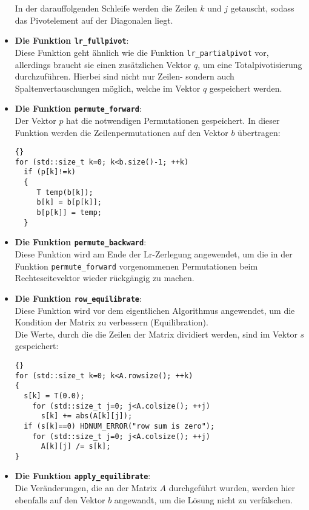 \documentclass[a4paper,11pt]{article}
\theoremstyle{definition}
\begin{document}
\begin{itemize}
In der darauffolgenden Schleife werden die Zeilen $k$ und $j$ getauscht, sodass das Pivotelement auf der Diagonalen liegt.

\item \textbf{Die Funktion \lstinline{lr_fullpivot}}:\\
Diese Funktion geht ähnlich wie die Funktion \lstinline{lr_partialpivot} vor, allerdings braucht sie einen zusätzlichen Vektor $q$, um eine Totalpivotisierung durchzuführen. Hierbei sind nicht nur Zeilen- sondern auch Spaltenvertauschungen möglich, welche im Vektor $q$ gespeichert werden.

\item \textbf{Die Funktion \lstinline{permute_forward}}:\\
Der Vektor $p$ hat die notwendigen Permutationen gespeichert. In dieser Funktion werden die Zeilenpermutationen auf den Vektor $b$ übertragen:
{\footnotesize{\begin{lstlisting}{}
for (std::size_t k=0; k<b.size()-1; ++k)
  if (p[k]!=k)
  {
     T temp(b[k]);
     b[k] = b[p[k]];
     b[p[k]] = temp;
  }
    \end{lstlisting}}}

\item \textbf{Die Funktion \lstinline{permute_backward}}:\\ 
Diese Funktion wird am Ende der Lr-Zerlegung angewendet, um die in der Funktion \lstinline{permute_forward} vorgenommenen Permutationen beim Rechteseitevektor wieder rückgängig zu machen.\\


\item \textbf{Die Funktion \lstinline{row_equilibrate}}:\\
Diese Funktion wird vor dem eigentlichen Algorithmus angewendet, um die Kondition der Matrix zu verbessern (Equilibration).\\
Die Werte, durch die die Zeilen der Matrix dividiert werden, sind im Vektor $s$ gespeichert:
{\footnotesize{\begin{lstlisting}{}
for (std::size_t k=0; k<A.rowsize(); ++k)
{
  s[k] = T(0.0);
    for (std::size_t j=0; j<A.colsize(); ++j)
      s[k] += abs(A[k][j]);
  if (s[k]==0) HDNUM_ERROR("row sum is zero");
    for (std::size_t j=0; j<A.colsize(); ++j)
      A[k][j] /= s[k];
}
    \end{lstlisting}}}


\item \textbf{Die Funktion \lstinline{apply_equilibrate}}:\\
Die Veränderungen, die an der Matrix $A$ durchgeführt wurden, werden hier ebenfalls auf den Vektor $b$ angewandt, um die Lösung nicht zu verfälschen.\\


\end{itemize}
\end{document}
